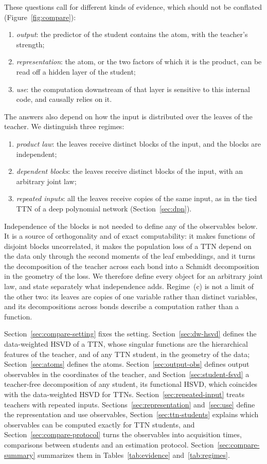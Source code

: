 \documentclass[11pt]{article}
\theoremstyle{definition}
\numberwithin{equation}{section}
\begin{document}
These questions call for different kinds of evidence, which should not be conflated (Figure~\ref{fig:compare}):
\begin{enumerate}[label=(\roman*),nosep]
\item \emph{output}: the predictor of the student contains the atom, with the teacher's strength;
\item \emph{representation}: the atom, or the two factors of which it is the product, can be read off a hidden layer of the student;
\item \emph{use}: the computation downstream of that layer is sensitive to this internal code, and causally relies on it.
\end{enumerate}
The answers also depend on how the input is distributed over the leaves of the teacher. We distinguish three regimes:
\begin{enumerate}[label=(\alph*),nosep]
\item \emph{product law}: the leaves receive distinct blocks of the input, and the blocks are independent;
\item \emph{dependent blocks}: the leaves receive distinct blocks of the input, with an arbitrary joint law;
\item \emph{repeated inputs}: all the leaves receive copies of the same input, as in the tied TTN of a deep polynomial network (Section~\ref{sec:dpn}).
\end{enumerate}
Independence of the blocks is not needed to define any of the observables below. It is a source of orthogonality and of exact computability: it makes functions of disjoint blocks uncorrelated, it makes the population loss of a TTN depend on the data only through the second moments of the leaf embeddings, and it turns the decomposition of the teacher across each bond into a Schmidt decomposition in the geometry of the loss. We therefore define every object for an arbitrary joint law, and state separately what independence adds. Regime~(c) is not a limit of the other two: its leaves are copies of one variable rather than distinct variables, and its decompositions across bonds describe a computation rather than a function.

Section~\ref{sec:compare-setting} fixes the setting. Section~\ref{sec:dw-hsvd} defines the data-weighted HSVD of a TTN, whose singular functions are the hierarchical features of the teacher, and of any TTN student, in the geometry of the data; Section~\ref{sec:atoms} defines the atoms. Section~\ref{sec:output-obs} defines output observables in the coordinates of the teacher, and Section~\ref{sec:student-fsvd} a teacher-free decomposition of any student, its functional HSVD, which coincides with the data-weighted HSVD for TTNs. Section~\ref{sec:repeated-input} treats teachers with repeated inputs. Sections~\ref{sec:representation} and~\ref{sec:use} define the representation and use observables, Section~\ref{sec:ttn-students} explains which observables can be computed exactly for TTN students, and Section~\ref{sec:compare-protocol} turns the observables into acquisition times, comparisons between students and an estimation protocol. Section~\ref{sec:compare-summary} summarizes them in Tables~\ref{tab:evidence} and~\ref{tab:regimes}.
\end{document}
